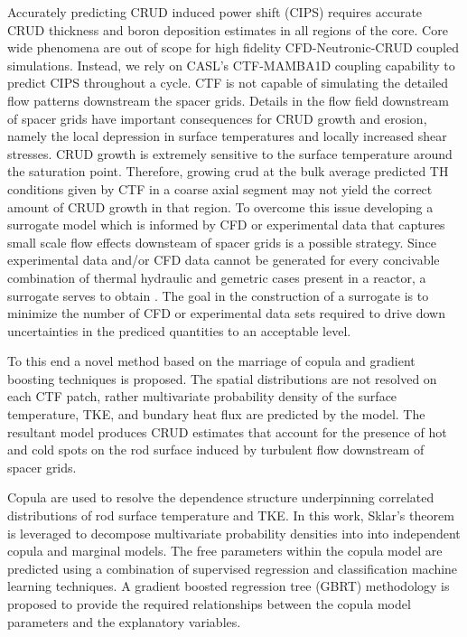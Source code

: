 Accurately predicting CRUD induced power shift (CIPS) requires accurate CRUD
thickness and boron deposition estimates in all regions of the core.  Core wide
phenomena are out of scope for high fidelity CFD-Neutronic-CRUD coupled
simulations.  Instead, we rely on CASL's CTF-MAMBA1D coupling capability to
predict CIPS throughout a cycle.  CTF is not capable of simulating the detailed
flow patterns downstream the spacer grids.  Details in the flow field
downstream of spacer grids have important consequences for CRUD growth and
erosion, namely the local depression in surface temperatures and locally
increased shear stresses.  CRUD growth is extremely sensitive to the surface
temperature around the saturation point.  Therefore, growing crud at the bulk
average predicted TH conditions given by CTF in a coarse axial segment may not
yield the correct amount of CRUD growth in that region.  To overcome this issue
developing a surrogate model which is informed by CFD or experimental data that
captures small scale flow effects downsteam of spacer grids is a possible strategy.
Since experimental data and/or CFD data cannot be generated for every concivable
combination of thermal hydraulic and gemetric cases present in a reactor, a surrogate
serves to obtain .  The goal in the construction of a surrogate is to minimize the
number of CFD or experimental data sets required to drive down uncertainties in
the prediced quantities to an acceptable level.

To this end a novel method based on the marriage of copula and gradient boosting techniques
is proposed.  The spatial distributions are not resolved on each CTF patch, rather
multivariate probability density of the surface temperature, TKE, and bundary heat flux
are predicted by the model.
The resultant model produces CRUD estimates that account for the presence of
hot and cold spots on the rod surface induced by turbulent flow downstream of spacer grids.

Copula are used to resolve the dependence structure underpinning correlated distributions
of rod surface temperature and TKE.  In this work, Sklar's theorem is leveraged
to decompose multivariate probability densities into into independent copula
and marginal models. The free parameters within the copula model are predicted using a combination of
supervised regression and classification machine learning techniques. A
gradient boosted regression tree (GBRT) methodology is proposed to provide the
required relationships between the copula model parameters and the
explanatory variables.

